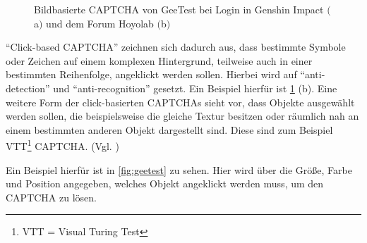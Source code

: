 \begin{figure}[h!]
    \centering
    \qquad
    \caption{Bildbasierte CAPTCHA von GeeTest bei Login in Genshin Impact $($a$)$ und dem Forum Hoyolab $($b$)$}   
    \label{fig:genshin}
\end{figure}

``Click-based CAPTCHA'' zeichnen sich dadurch aus, dass bestimmte Symbole oder Zeichen auf einem komplexen Hintergrund, 
teilweise auch in einer bestimmten Reihenfolge, angeklickt werden sollen.
Hierbei wird auf ``anti-detection'' und ``anti-recognition'' gesetzt. \cite[p.77]{surveyofresearch}
Ein Beispiel hierfür ist \ref{fig:genshin} (b).
Eine weitere Form der click-basierten CAPTCHAs sieht vor, dass Objekte ausgewählt werden sollen,
die beispielsweise die gleiche Textur besitzen oder räumlich nah an einem bestimmten anderen Objekt dargestellt sind. 
Diese sind zum Beispiel VTT\footnote[2]{VTT = Visual Turing Test} CAPTCHA. (Vgl. \cite[p.78]{surveyofresearch})

Ein Beispiel hierfür ist in \autoref{fig:geetest} zu sehen.
Hier wird über die Größe, Farbe und Position angegeben, welches Objekt angeklickt werden muss, um den CAPTCHA zu lösen.

